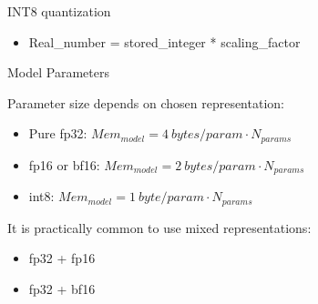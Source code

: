 \begin{vbframe}{INT8 quantization}
\href{https://de.mathworks.com/company/newsletters/articles/what-is-int8-quantization-and-why-is-it-popular-for-deep-neural-networks.html}{} 

\vfill

\begin{itemize}
\item Real\_number = stored\_integer * scaling\_factor
\end{itemize}

\vfill

\end{vbframe}


\begin{vbframe}{Model Parameters}

\vfill

Parameter size depends on chosen representation: \newline

\begin{itemize}
 	\item Pure fp32: $Mem_{model} = 4 ~bytes/param \cdot N_{params}$
 	\item fp16 or bf16: $Mem_{model} = 2 ~bytes/param \cdot N_{params}$
	\item int8: $Mem_{model} = 1 ~byte/param \cdot N_{params}$
\end{itemize}

\vskip8mm

It is practically common to use mixed representations: \newline

\begin{itemize}
 	\item fp32 + fp16
	\item fp32 + bf16
\end{itemize}

\vfill

\end{vbframe}


